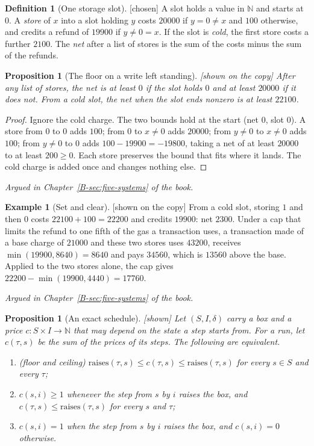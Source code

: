 \documentclass[11pt, a4paper]{article}
\theoremstyle{plain}
\newtheorem{proposition}[theorem]{Proposition}
\theoremstyle{definition}
\newtheorem{definition}[theorem]{Definition}
\newtheorem{example}[theorem]{Example}
\theoremstyle{remark}
\newcommand{\N}{\mathbb{N}}
\newcommand{\step}{\delta}
\newcommand{\cost}{c}
\newcommand{\argued}[1]{\par\noindent\textit{Argued in Chapter~\ref{B-#1} of the book.}\par}
\newcommand{\kind}[1]{\textup{[#1]}}
\begin{document}
\begin{definition}[One storage slot]\label{spec:slot} \kind{chosen}
A slot holds a value in $\N$ and starts at $0$. A \emph{store} of $x$ into a slot holding $y$ costs
$20000$ if $y=0\ne x$ and $100$ otherwise, and credits a refund of $19900$ if $y\ne0=x$. If the slot is
\emph{cold}, the first store costs a further $2100$. The \emph{net} after a list of stores is the sum of
the costs minus the sum of the refunds.
\end{definition}

\begin{proposition}[The floor on a write left standing]\label{spec:gas-floor} \kind{shown on the copy}
After any list of stores, the net is at least $0$ if the slot holds $0$ and at least $20000$ if it does not.
From a cold slot, the net when the slot ends nonzero is at least $22100$.
\end{proposition}

\begin{proof}
Ignore the cold charge. The two bounds hold at the start (net $0$, slot $0$). A store from $0$ to $0$ adds
$100$; from $0$ to $x\ne0$ adds $20000$; from $y\ne0$ to $x\ne0$ adds $100$; from $y\ne0$ to $0$ adds
$100-19900=-19800$, taking a net of at least $20000$ to at least $200\ge0$. Each store preserves the bound
that fits where it lands. The cold charge is added once and changes nothing else.
\end{proof}

\argued{sec:five-systems}

\begin{example}[Set and clear]\label{spec:gas-arith} \kind{shown on the copy}
From a cold slot, storing $1$ and then $0$ costs $22100+100=22200$ and credits $19900$: net $2300$. Under a
cap that limits the refund to one fifth of the gas a transaction uses, a transaction made of a base charge of
$21000$ and these two stores uses $43200$, receives $\min(19900,8640)=8640$ and pays $34560$, which is
$13560$ above the base. Applied to the two stores alone, the cap gives $22200-\min(19900,4440)=17760$.
\end{example}

\argued{sec:five-systems}

\begin{proposition}[An exact schedule]\label{spec:schedule} \kind{shown}
Let $(S,I,\step)$ carry a box and a price $\cost:S\times I\to\N$ that may depend on the state a step starts
from. For a run, let $\cost(\tau,s)$ be the sum of the prices of its steps. The following are equivalent.
\begin{enumerate}[label=(\alph*)]
\item (floor and ceiling) $\mathrm{raises}(\tau,s)\le\cost(\tau,s)\le\mathrm{raises}(\tau,s)$ for every
$s\in S$ and every $\tau$;
\item $\cost(s,i)\ge1$ whenever the step from $s$ by $i$ raises the box, and
$\cost(\tau,s)\le\mathrm{raises}(\tau,s)$ for every $s$ and $\tau$;
\item $\cost(s,i)=1$ when the step from $s$ by $i$ raises the box, and $\cost(s,i)=0$ otherwise.
\end{enumerate}
\end{proposition}
\end{document}
